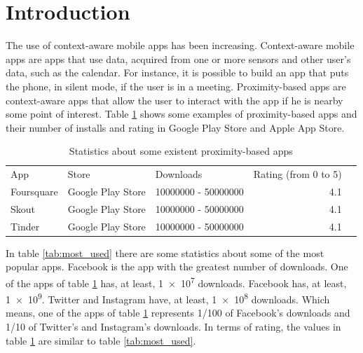
%
%

\section{Introduction}
\label{sec:introduction}


The use of context-aware mobile apps has been increasing.
Context-aware mobile apps are apps that use data, acquired
from one or more sensors and other user's data, 
such as the calendar. For instance, it is possible to
build an app that puts the phone, in silent mode, if the
user is in a meeting. Proximity-based apps are
context-aware apps that allow the user to interact
with the app if he is nearby some point of interest.
Table \ref{tab:statistics} shows some examples of proximity-based
apps and their number of installs and rating in Google
Play Store and Apple App Store. 

\begin{table}[h]
\centering
\begin{tabular}{|l|l|l|r|l}
\cline{1-4}
App & Store & Downloads & \multicolumn{1}{c|}{Rating (from 0 to 5)} &  \\ \cline{1-4}
Foursquare & Google Play Store & \num{10000000} - \num{50000000} & 4.1 &  \\ \cline{1-4}
Skout & Google Play Store & \num{10000000} - \num{50000000} & 4.1 &  \\ \cline{1-4}
Tinder & Google Play Store & \num{10000000} - \num{50000000} & 4.1 &  \\ \hline
\end{tabular}
\caption{Statistics about some existent proximity-based apps}
\label{tab:statistics}
\end{table}


In table \ref{tab:most_used} there are some statistics about
some of the most popular apps. Facebook is the app with the
greatest number of downloads. One of the apps of table
\ref{tab:statistics} has, at least, \num{1e7} downloads.
Facebook has, at least, \num{1e9}. Twitter and Instagram
have, at least, \num{1e8} downloads. Which means, one of
the apps of table \ref{tab:statistics} represents
1/100 of Facebook's downloads and 1/10 of Twitter's
and Instagram's downloads. In terms of rating, the
values in table \ref{tab:statistics} are similar to table
\ref{tab:most_used}.

